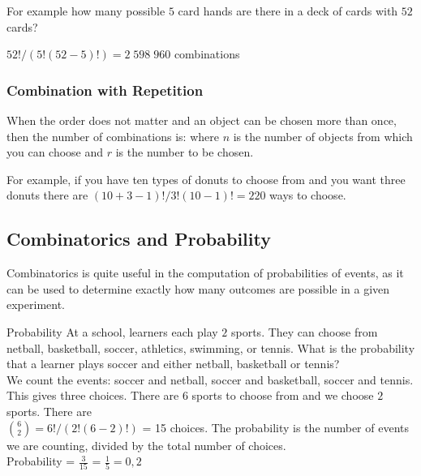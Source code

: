 For example how many possible $5$ card hands are there in a deck of cards with $52$ cards?

$52! / (5!(52-5)!) = 2\;598\;960$ combinations

\subsubsection{Combination with Repetition}

When the order does not matter and an object can be chosen more than once, then the number of combinations is:
where $n$ is the number of objects from which you can choose and $r$ is the number to be chosen.

For example, if you have ten types of donuts to choose from and you want three donuts there are $(10 + 3 - 1)! / 3!(10 - 1)! = 220$ ways to choose.

\subsection{Combinatorics and Probability}
Combinatorics is quite useful in the computation of probabilities of events, as it can be used to determine exactly how many outcomes are possible in a given experiment.

\begin{wex}{Probability}
{At a school, learners each play $2$ sports. They can choose from netball, basketball, soccer, athletics, swimming, or tennis. What is the probability that a learner plays soccer and either netball, basketball or tennis?\\}
{
 We count the events: soccer and netball, soccer and basketball, soccer and tennis. This gives three choices.
There are $6$ sports to choose from and we choose $2$ sports. There are \\$\binom{6}{2} = 6!/(2!(6-2)!)$ = 15 choices.
 The probability is the number of events we are counting, divided by the total number of choices.\\
Probability = $\frac{3}{15}$ = $\frac{1}{5} = 0,2$
}
\end{wex}

